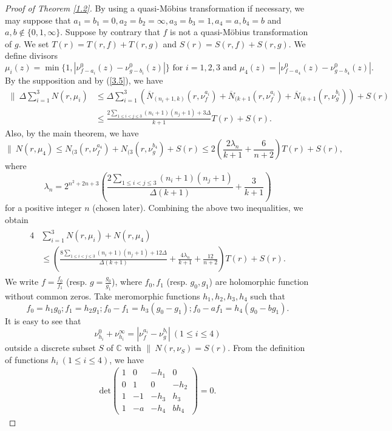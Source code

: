 \documentclass[12pt,leqno]{amsart}
\newcommand{\C}{{\mathbb{C}}}
\numberwithin{equation}{section}
\begin{document}
\begin{proof}[Proof of Theorem \ref{1.2}]
By using a quasi-M\"{o}bius transformation if necessary, we may suppose that $a_1=b_1=0,a_2=b_2=\infty,a_3=b_3=1,a_4=a,b_4=b$ and $a,b\not\in\{0,1,\infty\}$. Suppose by contrary that $f$ is not a quasi-M\"{o}bius transformation of $g$. We set $T(r)=T(r,f)+T(r,g)$ and $S(r)=S(r,f)+S(r,g).$ 
We define divisors 
$$\mu_i(z)=\min\{1,|\nu^0_{f-a_i}(z)-\nu^0_{g-b_i}(z)|\}\text{ for }i=1,2,3\text{ and }\mu_4(z)=|\nu^0_{f-a_4}(z)-\nu^0_{g-b_4}(z)|.$$
By the supposition and by (\ref{3.5}), we have
\begin{align*}
\|\ \Delta\sum_{i=1}^3N(r,\mu_i)&\le\Delta\sum_{i=1}^3\left(\overline N_{(n_i+1,k)}(r,\nu^{a_i}_f)+\overline N_{(k+1}(r,\nu^{a_i}_f)+\overline N_{(k+1}(r,\nu^{b_i}_g)\right)+S(r)\\
&\le \frac{2\sum_{1\le i<j\le 3}(n_i+1)(n_j+1)+3\Delta}{k+1}T(r)+S(r).
\end{align*}
Also, by the main theorem, we have
$$\|\ N(r,\mu_4)\le N_{(3}(r,\nu^{a_4}_f)+N_{(3}(r,\nu^{b_4}_g)+S(r)\le 2\left(\frac{2\lambda_n}{k+1}+\frac{6}{n+2}\right)T(r)+S(r),$$
where
$$\lambda_n=2^{n^2+2n+3}\left(\frac{2\sum_{1\le i<j\le 3}(n_i+1)(n_j+1)}{\Delta(k+1)}+\frac{3}{k+1}\right)$$
for a positive integer $n$ (chosen later). Combining the above two inequalities, we obtain
\begin{align}\label{4.2}
\begin{split}
4&\sum_{i=1}^3N(r,\mu_i)+N(r,\mu_4)\\
&\le \left(\frac{8\sum_{1\le i<j\le 3}(n_i+1)(n_j+1)+12\Delta}{\Delta(k+1)}+\frac{4\lambda_n}{k+1}+\frac{12}{n+2}\right)T(r)+S(r).
\end{split}
\end{align}
We write $f=\frac{f_0}{f_1}$ (resp. $g=\frac{g_0}{g_1}$), where $f_0,f_1$ (resp. $g_0,g_1$) are holomorphic function without common zeros. Take meromorphic functions $h_1,h_2,h_3,h_4$ such that
$$f_0=h_1 g_0;f_1=h_2 g_1;f_0-f_1=h_3(g_0-g_1);f_0-af_1=h_4(g_0-bg_1).$$
It is easy to see that 
$$\nu^0_{h_i}+\nu^\infty_{h_i}=|\nu^{a_i}_f-\nu^{b_i}_g|\ (1\le i\le 4)$$
outside a discrete subset $S$ of $\C$ with $\|\ N(r,\nu_S)=S(r)$.
From the definition of functions $h_i\ (1\le i\le 4)$, we have 
\begin{align*}
\mathrm{det}\left (
\begin{array}{cccc}
1&0&-h_1&0\\ 
0&1&0&-h_2\\
1&-1&-h_3&h_3\\
1&-a&-h_4&bh_4
\end{array}\right )=0.

\end{align*}
\end{proof}
\end{document}
